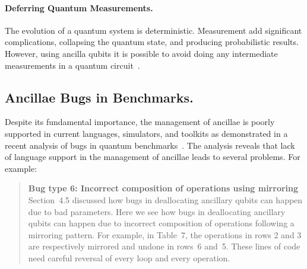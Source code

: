 \documentclass[sigplan,10pt,review,anonymous]{acmart}
\begin{document}
\paragraph*{Deferring Quantum Measurements.} The evolution of a
quantum system is deterministic. Measurement add significant
complications, collapsing the quantum state, and producing
probabilistic results. However, using ancilla qubits it is possible to
avoid doing any intermediate measurements in a quantum
circuit~\cite{dewolf}. 

\subsection{Ancillae Bugs in Benchmarks.}
Despite its fundamental importance, the management of ancillae is
poorly supported in current languages, simulators, and toolkits as
demonstrated in a recent analysis of bugs in quantum
benchmarks~\cite{DBLP:conf/oopsla/HuangM18}. The analysis reveals that
lack of language support in the management of ancillae leads to
several problems. For example: 
\begin{quote}
  \textbf{Bug type 6: Incorrect composition of operations using mirroring}
  Section~4.5 discussed how bugs in deallocating ancillary qubits can
  happen due to bad parameters. Here we see how bugs in deallocating
  ancillary qubits can happen due to incorrect composition of
  operations following a mirroring pattern. For example, in Table~7,
  the operations in rows 2 and 3 are respectively mirrored and undone
  in rows~6 and~5. These lines of code need careful reversal of every
  loop and every operation.
\end{quote}
\end{document}
